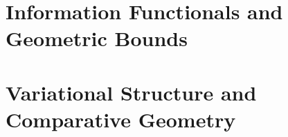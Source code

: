\documentclass[12pt,a4paper]{book}
\theoremstyle{plain}
\begin{document}
\part{Information Functionals and Geometric Bounds}\label{ch:part:functionals}








\part{Variational Structure and Comparative Geometry}\label{ch:part:variational}
















\backmatter


\end{document}
